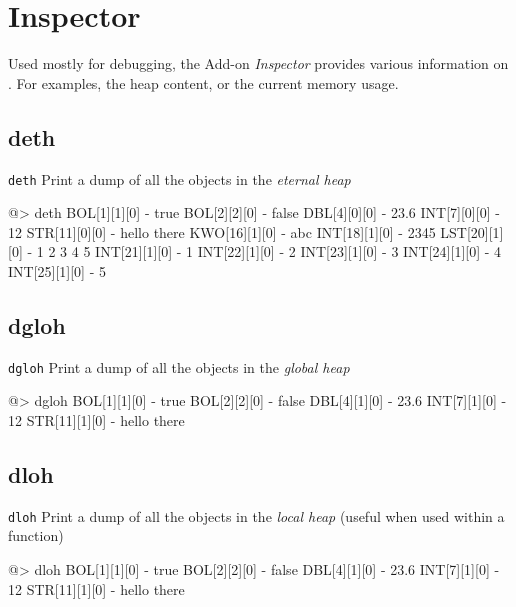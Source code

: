 
\section{Inspector} 

Used mostly for debugging, the Add-on {\em Inspector} provides various information on \squirrel.  For examples, the heap content, or the current memory usage.


\subsection*{deth}  
 
{\tt deth} 
\newline\newline 
Print a dump of all the objects in the {\it eternal heap}
\begin{verbatimtab} 
@> deth
BOL[1][1][0] - true
BOL[2][2][0] - false
DBL[4][0][0] - 23.6
INT[7][0][0] - 12
STR[11][0][0] - hello there
KWO[16][1][0] - abc
INT[18][1][0] - 2345
LST[20][1][0] - 1 2 3 4 5
INT[21][1][0] - 1
INT[22][1][0] - 2
INT[23][1][0] - 3
INT[24][1][0] - 4
INT[25][1][0] - 5 
\end{verbatimtab} 

\subsection*{dgloh}  
 
{\tt dgloh} 
\newline\newline 
Print a dump of all the objects in the {\it global heap}
\begin{verbatimtab} 
@> dgloh 
BOL[1][1][0] - true
BOL[2][2][0] - false
DBL[4][1][0] - 23.6
INT[7][1][0] - 12
STR[11][1][0] - hello there 
\end{verbatimtab} 

\subsection*{dloh}  
 
{\tt dloh} 
\newline\newline 
Print a dump of all the objects in the {\it local heap} (useful when used within a function)
\begin{verbatimtab} 
@> dloh 
BOL[1][1][0] - true
BOL[2][2][0] - false
DBL[4][1][0] - 23.6
INT[7][1][0] - 12
STR[11][1][0] - hello there 
\end{verbatimtab} 

